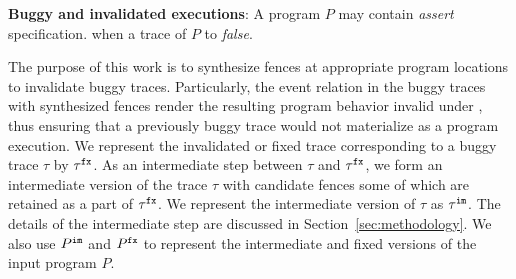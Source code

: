 
\noindent
{\bf Buggy and invalidated executions}: A  
program $P$ may contain {\em assert}    
 specification.  when a trace of $P$ 
  to
{\em false}. 


The purpose of this work 
is to synthesize \cc fences at appropriate
program locations to invalidate buggy traces. Particularly, the
event relation in the buggy traces with synthesized fences
render the resulting program behavior invalid under \cc, thus ensuring
that a previously buggy trace would not materialize as a 
\cc program execution. 
We represent the invalidated or fixed trace corresponding to a 
buggy trace $\tau$ by ${\tau}^{\mathtt{fx}}$. 
%
As an intermediate step between $\tau$ and ${\tau}^{\mathtt{fx}}$, we form an 
intermediate version of the trace $\tau$ with candidate fences
some of which are retained as a part of ${\tau}^{\mathtt{fx}}$. We represent
the intermediate version of $\tau$ as ${\tau}^{\mathtt{im}}$. The details
of the intermediate step are discussed in Section~\ref{sec:methodology}.
%
We also use ${P}^{\mathtt{im}}$ and ${P}^{\mathtt{fx}}$ to represent the intermediate and
fixed versions of the input program $P$.
